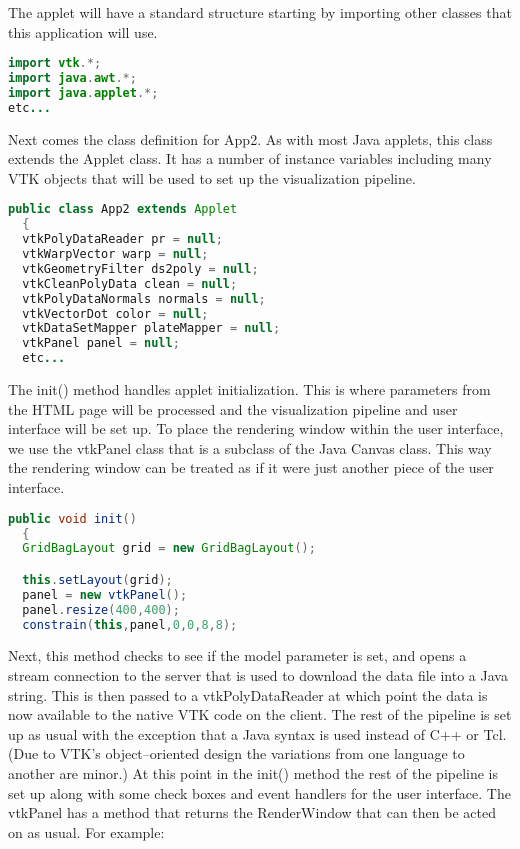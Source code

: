 The applet will have a standard structure starting by importing other classes that this application will use.

\begin{lstlisting}[language=Java, caption={}, numbers=none, frame=none]
import vtk.*;
import java.awt.*;
import java.applet.*;
etc...
\end{lstlisting}

Next comes the class definition for App2. As with most Java applets, this class extends the Applet class. It has a number of instance variables including many VTK objects that will be used to set up the visualization pipeline.

\begin{lstlisting}[language=Java, caption={}, numbers=none, frame=none]
public class App2 extends Applet
  {
  vtkPolyDataReader pr = null;
  vtkWarpVector warp = null;
  vtkGeometryFilter ds2poly = null;
  vtkCleanPolyData clean = null;
  vtkPolyDataNormals normals = null;
  vtkVectorDot color = null;
  vtkDataSetMapper plateMapper = null;
  vtkPanel panel = null;
  etc...
\end{lstlisting}

The init() method handles applet initialization. This is where parameters from the HTML page will be processed and the visualization pipeline and user interface will be set up. To place the rendering window within the user interface, we use the vtkPanel class that is a subclass of the Java Canvas class. This way the rendering window can be treated as if it were just another piece of the user interface.

\begin{lstlisting}[language=Java, caption={}, numbers=none, frame=none]
public void init()
  {
  GridBagLayout grid = new GridBagLayout();

  this.setLayout(grid);
  panel = new vtkPanel();
  panel.resize(400,400);
  constrain(this,panel,0,0,8,8);
\end{lstlisting}

Next, this method checks to see if the model parameter is set, and opens a stream connection to the server that is used to download the data file into a Java string. This is then passed to a vtkPolyDataReader at which point the data is now available to the native VTK code on the client. The rest of the pipeline is set up as usual with the exception that a Java syntax is used instead of C++ or Tcl. (Due to VTK's object--oriented design the variations from one language to another are minor.) At this point in the init() method the rest of the pipeline is set up along with some check boxes and event handlers for the user interface. The vtkPanel has a method that returns the RenderWindow that can then be acted on as usual. For example:

